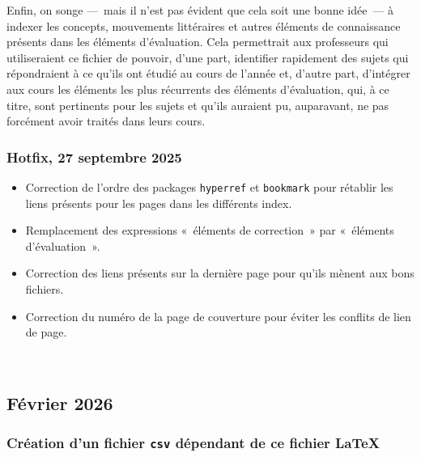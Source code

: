 Enfin, on songe ---~mais il n'est pas évident que cela soit une bonne idée~--- à indexer les concepts, mouvements littéraires et autres éléments de connaissance présents dans les éléments d'évaluation. Cela permettrait aux professeurs qui utiliseraient ce fichier de pouvoir, d'une part, identifier rapidement des sujets qui répondraient à ce qu'ils ont étudié au cours de l'année et, d'autre part, d'intégrer aux cours les éléments les plus récurrents des éléments d'évaluation, qui, à ce titre, sont pertinents pour les sujets et qu'ils auraient pu, auparavant, ne pas forcément avoir traités dans leurs cours.

\subsubsection{Hotfix, 27 septembre 2025}

\begin{itemize}
\item Correction de l'ordre des packages \texttt{hyperref} et \texttt{bookmark} pour rétablir les liens présents pour les pages dans les différents index.

\item Remplacement des expressions «~éléments de correction~» par «~éléments d'évaluation~». 

\item Correction des liens présents sur la dernière page pour qu'ils mènent aux bons fichiers.

\item Correction du numéro de la page de couverture pour éviter les conflits de lien de page.
\end{itemize}

\vfill{~}

\subsection{Février 2026}

\subsubsection{Création d'un fichier \texttt{csv} dépendant de ce fichier \LaTeX{}}

